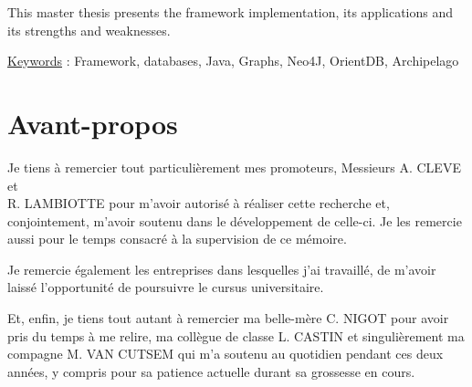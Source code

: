 \documentclass[a4paper,fleqn,12pt,oneside]{book}
\begin{document}
This master thesis presents the framework implementation, its applications and its strengths and weaknesses.

\quad \quad \underline{Keywords} : Framework, databases, Java, Graphs, Neo4J, OrientDB, Archipelago
\chapter*{Avant-propos}

Je tiens à remercier tout particulièrement mes promoteurs, Messieurs A. CLEVE et \\R. LAMBIOTTE pour m'avoir autorisé à réaliser cette recherche et, conjointement, m'avoir soutenu dans le développement de celle-ci. Je les remercie aussi pour le temps consacré à la supervision de ce mémoire. 

Je remercie également les entreprises dans lesquelles j'ai travaillé, de m'avoir laissé l'opportunité de poursuivre le cursus universitaire.

Et, enfin, je tiens tout autant à remercier ma belle-mère C. NIGOT pour avoir pris du temps à me relire, ma collègue de classe L. CASTIN  et singulièrement ma compagne M. VAN CUTSEM qui m'a soutenu au quotidien pendant ces deux années, y compris pour sa patience actuelle durant sa grossesse en cours.


\tableofcontents
\newpage
\end{document}
